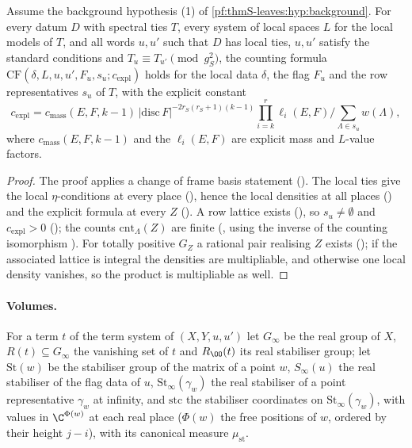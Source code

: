 \begin{proposition}\label{pf:thmS-leaves:prop:formula}
Assume the background hypothesis (1) of \cref{pf:thmS-leaves:hyp:background}. For every datum $D$ with spectral ties $T$, every system of local spaces $L$ for the local models of $T$, and all words $u,u'$ such
that $D$ has local ties, $u,u'$ satisfy the standard conditions and $T_u\equiv T_{u'}\pmod{g_S^2}$, the counting formula
$\mathrm{CF}(\delta,L,u,u',F_u,s_u;c_{\mathrm{expl}})$ holds for the local data $\delta$, the flag $F_u$ and the row representatives $s_u$ of
$T$, with the explicit constant
\[
c_{\mathrm{expl}}=c_{\mathrm{mass}}(E,F,k-1)\,|\mathrm{disc}\,F|^{-2r_S(r_S+1)(k-1)}\prod_{i=k}^{r}\ell_i(E,F)\Big/\sum_{\Lambda\in s_u}w(\Lambda),
\]
where $c_{\mathrm{mass}}(E,F,k-1)$ and the $\ell_i(E,F)$ are explicit mass and $L$-value factors.
\end{proposition}

\begin{proof}
The proof applies a change of frame basis statement (). The local
ties give the local $\eta$-conditions at every place (), hence the local
densities at all places () and the explicit formula at every $Z$
(). A row lattice exists (),
so $s_u\ne\emptyset$ and $c_{\mathrm{expl}}>0$ (); the counts $\mathrm{cnt}_\Lambda(Z)$ are finite
(, using the inverse of the counting isomorphism
). For totally positive $G_Z$ a rational pair realising $Z$ exists
(); if the associated lattice is integral the densities are multipliable, and
otherwise one local density vanishes, so the product is multipliable as well.
\end{proof}

\paragraph{Volumes.} For a term $t$ of the term system of $(X,Y,u,u')$ let $G_\infty$ be the real group of $X$, $R(t)\subseteq G_\infty$ the vanishing set
of $t$ and $R_{\OO}(t)$ its real stabiliser group; let $\mathrm{St}(w)$ be the stabiliser group of the matrix of a point $w$, $S_\infty(u)$ the real
stabiliser of the flag data of $u$, $\mathrm{St}_\infty(\gamma_w)$ the real stabiliser of a point representative $\gamma_w$ at infinity, and
$\mathrm{stc}$ the stabiliser coordinates on $\mathrm{St}_\infty(\gamma_w)$, with values in $\C^{\Phi(w)}$ at each real place ($\Phi(w)$ the free positions
of $w$, ordered by their height $j-i$), with its canonical measure $\mu_{\mathrm{st}}$.

